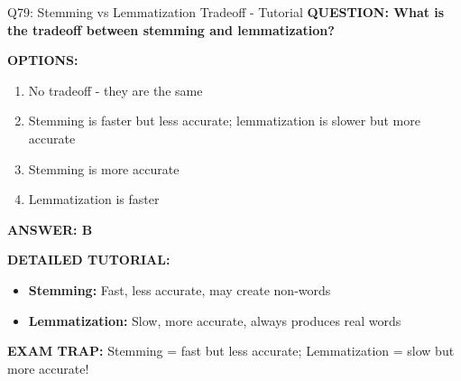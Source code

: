 \documentclass[8pt]{beamer}
\begin{document}
	\begin{frame}{Q79: Stemming vs Lemmatization Tradeoff - Tutorial}
		\fontsize{6.5}{7.5}\selectfont
		\textbf{QUESTION: What is the tradeoff between stemming and lemmatization?}
		
		\vspace{0.1cm}
		\textbf{OPTIONS:}
		\begin{enumerate}
			\item No tradeoff - they are the same
			\item Stemming is faster but less accurate; lemmatization is slower but more accurate
			\item Stemming is more accurate
			\item Lemmatization is faster
		\end{enumerate}
		
		\vspace{0.1cm}
		\textcolor{myblue}{\textbf{ANSWER: B}}
		
		\vspace{0.1cm}
		\textbf{DETAILED TUTORIAL:}
		\begin{itemize}
			\item \textbf{Stemming:} Fast, less accurate, may create non-words
			\item \textbf{Lemmatization:} Slow, more accurate, always produces real words
		\end{itemize}
		
		\textcolor{myred}{\textbf{EXAM TRAP:}} Stemming = \textcolor{myblue}{fast but less accurate}; Lemmatization = \textcolor{myblue}{slow but more accurate}!
	\end{frame}
	
\end{document}
